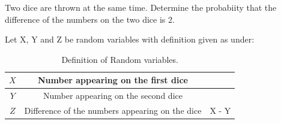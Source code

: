 \documentclass[]{article}
\begin{document}
\providecommand{\qfunc}[1]{\ensuremath{Q\left(#1\right)}}
\providecommand{\gauss}[2]{\mathcal{N}\ensuremath{\left(#1,#2\right)}}
\providecommand{\diff}[2]{\ensuremath{\frac{d{#1}}{d{#2}}}}
\providecommand{\myceil}[1]{\left \lceil #1 \right \rceil }
\newcommand\figref{Fig.~\ref}
\newcommand\tabref{Table~\ref}
\newcommand{\sinc}{\,\text{sinc}\,}
\newcommand{\rect}{\,\text{rect}\,}

\let\vec\mathbf

Two dice are thrown at the same time. Determine the probabiity that the difference
of the numbers on the two dice is 2. 

\solution
Let X, Y and Z be random variables with definition given as under:
\begin{table}[H]
\centering
\begin{tabular}{|c|c|c|}
    \hline
    $X$ & Number appearing on the first dice & \\
    \hline
    $Y$ & Number appearing on the second dice & \\
    \hline
    $Z$ & Difference of the numbers appearing on the dice & X - Y\\
    \hline
\end{tabular}
\label{tab:ncert/10/13/3/1/}
\caption{Definition of Random variables.}
\end{table}
\end{document}
